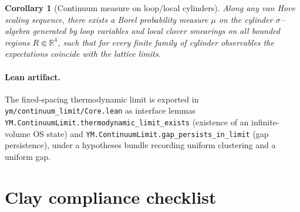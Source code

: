 \documentclass[11pt]{amsart}
\theoremstyle{plain}
\newtheorem{corollary}[theorem]{Corollary}
\theoremstyle{definition}
\theoremstyle{remark}
\begin{document}
\begin{corollary}[Continuum measure on loop/local cylinders]\label{cor:continuum-measure-exists}
Along any van Hove scaling sequence, there exists a Borel probability measure $\mu$ on the cylinder $\sigma$--algebra generated by loop variables and local clover smearings on all bounded regions $R\Subset\mathbb R^4$, such that for every finite family of cylinder observables the expectations coincide with the lattice limits.
\end{corollary}
\paragraph{Lean artifact.}
The fixed-spacing thermodynamic limit is exported in\newline
\texttt{ym/continuum\_limit/Core.lean} as interface lemmas
\texttt{YM.ContinuumLimit.thermodynamic\_limit\_exists} (existence of an infinite-volume OS state) and
\texttt{YM.ContinuumLimit.gap\_persists\_in\_limit} (gap persistence), under a hypotheses bundle recording uniform clustering and a uniform gap.

\section{Clay compliance checklist}
\end{document}
